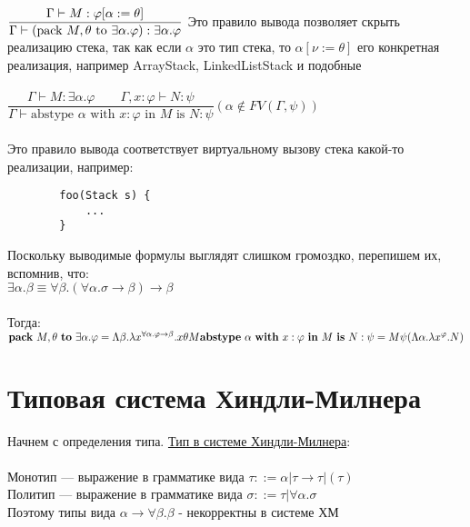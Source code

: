 	
 	$\dfrac{\Gamma \vdash M : \varphi[\alpha := \theta]}{\Gamma\vdash (\text{pack } M, \theta \text{ to } \exists \alpha . \varphi) : \exists \alpha.\varphi}\\ \\ \\
 	 $ Это правило вывода позволяет скрыть реализацию стека, так как если $\alpha$ это тип стека, то $\alpha[\nu := \theta]$ его конкретная реализация, например ArrayStack, LinkedListStack и подобные \\ \\
 	 $
 	\dfrac{\Gamma \vdash M : \exists \alpha . \varphi\qquad\Gamma, x : \varphi \vdash N : \psi}{\Gamma \vdash \text{abstype } \alpha \text{ with } x:\varphi \text{ in } M \text{ is } N:\psi}
	(\alpha \notin FV(\Gamma, \psi))$
	\\ \\
	Это правило вывода соответствует виртуальному вызову стека какой-то реализации, например: 
	\begin{verbatim}
		foo(Stack s) {
			...
		}
	\end{verbatim}
	Поскольку выводимые формулы выглядят слишком громоздко, перепишем их, вспомнив, что: \\
	$\exists\alpha.\beta\equiv\forall\beta.(\forall\alpha.\sigma\rightarrow\beta)\rightarrow\beta$\\\\
	Тогда: \\
	$	\text{\textbf{pack} } M, \theta \text{ \textbf{to} } \exists \alpha . \varphi =
		\Lambda \beta . \lambda x^{\forall \alpha . \varphi \to \beta} . x \theta M \\
		\text{\textbf{abstype} } \alpha \text{ \textbf{with} } x:\varphi \text{ \textbf{in} } M \text{ \textbf{is} } N:\psi =
		M \psi (\Lambda \alpha . \lambda x ^ \varphi . N)
	$
	
	 \section{Типовая система Хиндли-Милнера}
	   
	 Начнем с определения типа. \underline{Тип в системе Хиндли-Милнера}: \\ \\
	 Монотип — выражение в грамматике вида $\tau::=\alpha|\tau\rightarrow\tau|(\tau)$\\
	 Политип — выражение в грамматике вида $\sigma::=\tau|\forall\alpha.\sigma$\\
	 
	 \noindent Поэтому типы вида $\alpha\rightarrow\forall\beta.\beta$ - некорректны в системе ХМ\\
	 
